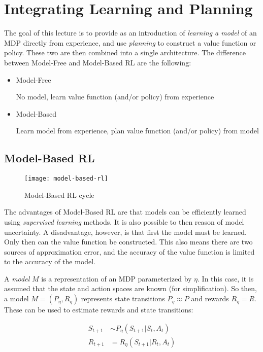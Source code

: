 \chapter{Integrating Learning and Planning}

The goal of this lecture is to provide as an introduction of \textit{learning a model} of an MDP directly from experience, and use \textit{planning} to construct a value function or policy. These two are then combined into a single architecture. The difference between Model-Free and Model-Based RL are the following:
\begin{itemize}
	\item Model-Free
	
	No model, learn value function (and/or policy) from experience
	\item Model-Based
	
	Learn model from experience, plan value function (and/or policy) from model
\end{itemize}

\section{Model-Based RL}

\begin{figure}[H]
	\centering
	\texttt{[image: model-based-rl]}
	\caption{Model-Based RL cycle}
\end{figure}

The advantages of Model-Based RL are that models can be efficiently learned using \textit{supervised learning} methods. It is also possible to then reason of model uncertainty. A disadvantage, however, is that first the model must be learned. Only then can the value function be constructed. This also means there are two sources of approximation error, and the accuracy of the value function is limited to the accuracy of the model.

A \textit{model} $M$ is a representation of an MDP parameterized by $\eta$. In this case, it is assumed that the state and action spaces are known (for simplification). So then, a model $M = (P_\eta, R_\eta)$ represents state transitions $P_\eta \approx P$ and rewards $R_\eta = R$. These can be used to estimate rewards and state transitions:

\begin{equation*}
	\begin{aligned}
		S_{t+1} & \sim P_\eta(S_{t+1} | S_t, A_t)\\
		R_{t+1} & = R_\eta(S_{t+1} | R_t, A_t)
	\end{aligned}
\end{equation*}

